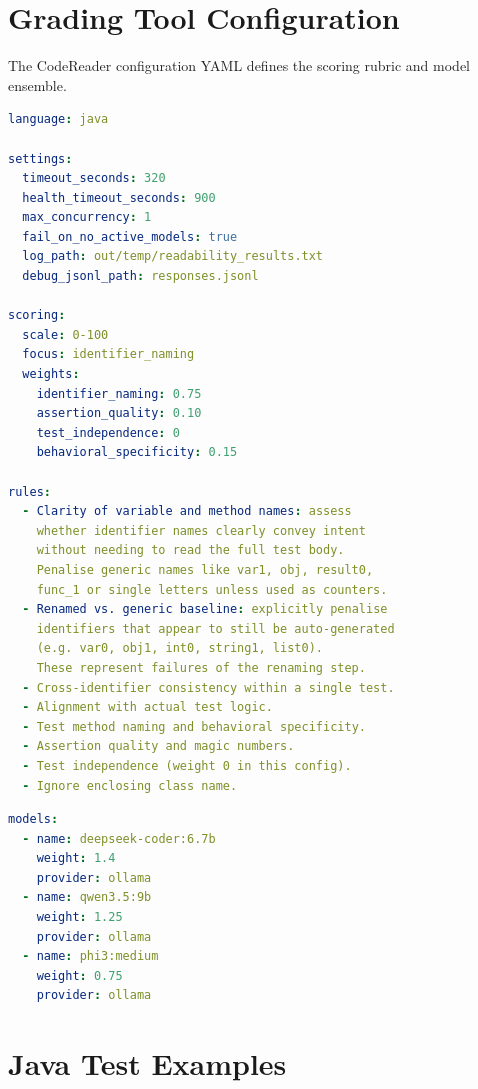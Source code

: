 \documentclass[conference]{IEEEtran}
\begin{document}
\section{Grading Tool Configuration}
\label{app:config}

The CodeReader configuration YAML defines the scoring rubric and model ensemble.

\begin{lstlisting}[caption={CodeReader Configuration (Part 1 -- Scoring \& Rules)},
                   label={lst:config1},language=yaml]
language: java

settings:
  timeout_seconds: 320
  health_timeout_seconds: 900
  max_concurrency: 1
  fail_on_no_active_models: true
  log_path: out/temp/readability_results.txt
  debug_jsonl_path: responses.jsonl

scoring:
  scale: 0-100
  focus: identifier_naming
  weights:
    identifier_naming: 0.75
    assertion_quality: 0.10
    test_independence: 0
    behavioral_specificity: 0.15

rules:
  - Clarity of variable and method names: assess
    whether identifier names clearly convey intent
    without needing to read the full test body.
    Penalise generic names like var1, obj, result0,
    func_1 or single letters unless used as counters.
  - Renamed vs. generic baseline: explicitly penalise
    identifiers that appear to still be auto-generated
    (e.g. var0, obj1, int0, string1, list0).
    These represent failures of the renaming step.
  - Cross-identifier consistency within a single test.
  - Alignment with actual test logic.
  - Test method naming and behavioral specificity.
  - Assertion quality and magic numbers.
  - Test independence (weight 0 in this config).
  - Ignore enclosing class name.
\end{lstlisting}

\begin{lstlisting}[caption={CodeReader Configuration (Part 2 -- Model Ensemble)},
                   label={lst:config2},language=yaml]
models:
  - name: deepseek-coder:6.7b
    weight: 1.4
    provider: ollama
  - name: qwen3.5:9b
    weight: 1.25
    provider: ollama
  - name: phi3:medium
    weight: 0.75
    provider: ollama
\end{lstlisting}

\section{Java Test Examples}
\label{app:javaexamples}
\end{document}
